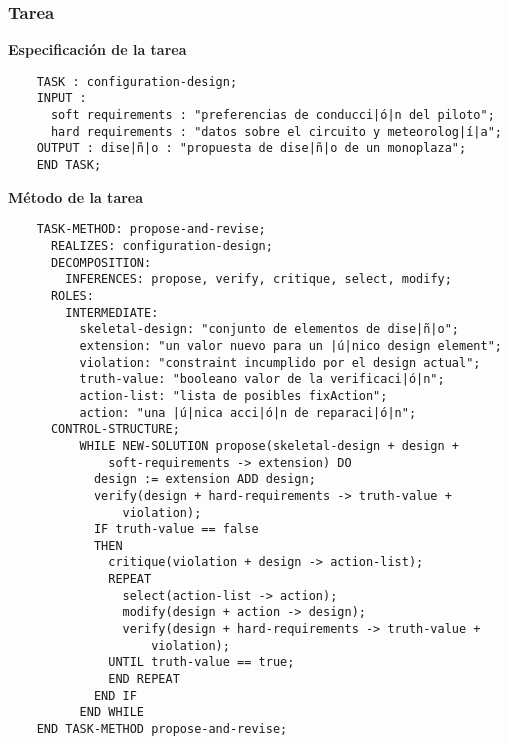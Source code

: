 \documentclass[12pt,a4paper,twoside,spanish]{article}      %
\begin{document}
\newpage
\subsubsection{Tarea}
\textbf {Especificación de la tarea}
\begin{lstlisting}
    TASK : configuration-design;
    INPUT :
      soft requirements : "preferencias de conducci|ó|n del piloto";
      hard requirements : "datos sobre el circuito y meteorolog|í|a";
    OUTPUT : dise|ñ|o : "propuesta de dise|ñ|o de un monoplaza";
    END TASK;
\end{lstlisting}

\textbf {Método de la tarea}
\begin{lstlisting}
    TASK-METHOD: propose-and-revise;
      REALIZES: configuration-design;
      DECOMPOSITION:
        INFERENCES: propose, verify, critique, select, modify;
      ROLES:
        INTERMEDIATE:
          skeletal-design: "conjunto de elementos de dise|ñ|o";
          extension: "un valor nuevo para un |ú|nico design element";
          violation: "constraint incumplido por el design actual";
          truth-value: "booleano valor de la verificaci|ó|n";
          action-list: "lista de posibles fixAction";
          action: "una |ú|nica acci|ó|n de reparaci|ó|n";
      CONTROL-STRUCTURE;
          WHILE NEW-SOLUTION propose(skeletal-design + design +
              soft-requirements -> extension) DO
            design := extension ADD design;
            verify(design + hard-requirements -> truth-value +
                violation);
            IF truth-value == false
            THEN
              critique(violation + design -> action-list);
              REPEAT
                select(action-list -> action);
                modify(design + action -> design);
                verify(design + hard-requirements -> truth-value +
                    violation);
              UNTIL truth-value == true;
              END REPEAT
            END IF
          END WHILE
    END TASK-METHOD propose-and-revise;
\end{lstlisting}

\end{document}
